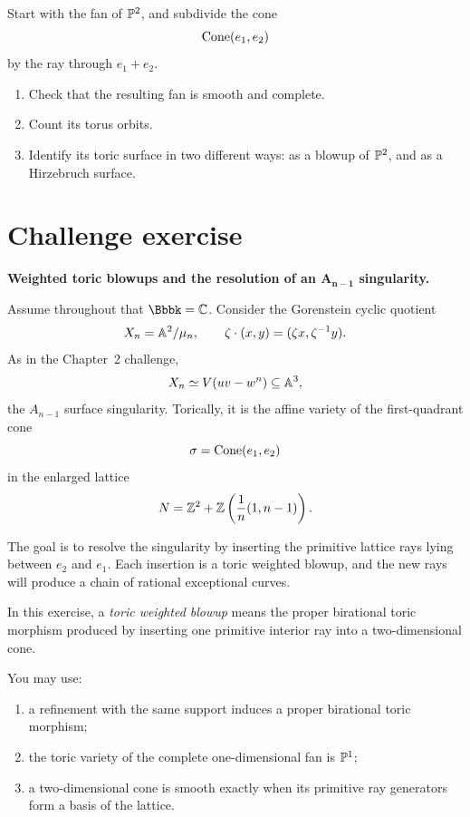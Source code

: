 \begin{exercises}
\item Start with the fan of \(\mathbb{P}^2\), and subdivide the cone
\[
\operatorname{Cone}(e_1,e_2)
\]
by the ray through \(e_1+e_2\).
\begin{enumerate}[label=(\alph*),wide=0pt]
\item Check that the resulting fan is smooth and complete.
\item Count its torus orbits.
\item Identify its toric surface in two different ways:
as a blowup of \(\mathbb{P}^2\), and as a Hirzebruch surface.
\end{enumerate}

\end{exercises}

\clearpage
\section*{Challenge exercise}

\noindent
\textbf{Weighted toric blowups and the resolution of an
\(\boldsymbol{A_{n-1}}\) singularity.}

\medskip

Assume throughout that \(\Bbbk=\CC\). Consider the Gorenstein cyclic
quotient
\[
X_n
=
\mathbb{A}^2/\mu_n,
\qquad
\zeta\cdot(x,y)=(\zeta x,\zeta^{-1}y).
\]
As in the Chapter~2 challenge,
\[
X_n
\simeq
V(uv-w^n)\subseteq\mathbb{A}^3,
\]
the \(A_{n-1}\) surface singularity. Torically, it is the affine
variety of the first-quadrant cone
\[
\sigma=\operatorname{Cone}(e_1,e_2)
\]
in the enlarged lattice
\[
N
=
\mathbb{Z}^2+
\mathbb{Z}\left(\frac1n(1,n-1)\right).
\]

The goal is to resolve the singularity by inserting the primitive
lattice rays lying between \(e_2\) and \(e_1\). Each insertion is a
toric weighted blowup, and the new rays will produce a chain of
rational exceptional curves.

\begin{warningbox}
In this exercise, a \emph{toric weighted blowup} means the proper
birational toric morphism produced by inserting one primitive
interior ray into a two-dimensional cone.

You may use:
\begin{enumerate}[label=(\roman*),wide=0pt]
\item a refinement with the same support induces a proper birational
toric morphism;
\item the toric variety of the complete one-dimensional fan is
\(\mathbb{P}^1\);
\item a two-dimensional cone is smooth exactly when its primitive ray
generators form a basis of the lattice.
\end{enumerate}
\end{warningbox}


